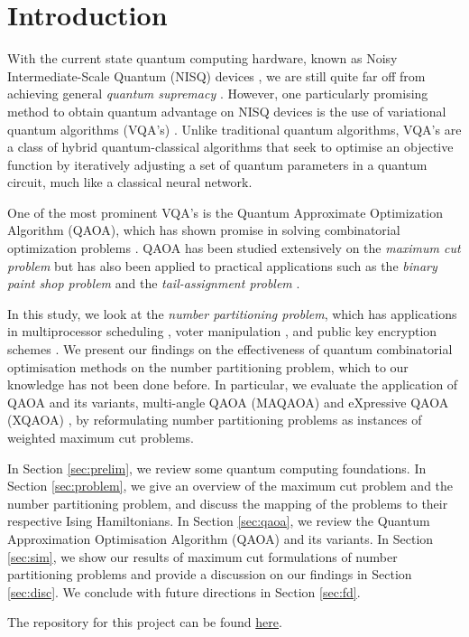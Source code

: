 \section{Introduction}

With the current state quantum computing hardware, known as Noisy Intermediate-Scale Quantum (NISQ) devices \cite{Preskill2018quantumcomputingin}, we are still quite far off from achieving general \emph{quantum supremacy} \cite{boixo2018characterizing}. However, one particularly promising method to obtain quantum advantage on NISQ devices is the use of variational quantum algorithms (VQA's) \cite{cerezo2021variational}. Unlike traditional quantum algorithms, VQA's are a class of hybrid quantum-classical algorithms that seek to optimise an objective function by iteratively adjusting a set of quantum parameters in a quantum circuit, much like a classical neural network.

One of the most prominent VQA's is the Quantum Approximate Optimization Algorithm (QAOA), which has shown promise in solving combinatorial optimization problems \cite{farhi2014quantum}. QAOA has been studied extensively on the \emph{maximum cut problem} but has also been applied to practical applications such as the \emph{binary paint shop problem} \cite{streif2021beating} and the \emph{tail-assignment problem} \cite{vikstaal2020applying}.

In this study, we look at the \emph{number partitioning problem}, which has applications in multiprocessor scheduling \cite{sarkar1987partitioning}, voter manipulation \cite{walsh2009really}, and public key encryption schemes \cite{merkle1978hiding}. We present our findings on the effectiveness of quantum combinatorial optimisation methods on the number partitioning problem, which to our knowledge has not been done before. In particular, we evaluate the application of QAOA and its variants, multi-angle QAOA (MAQAOA) \cite{herrman2022multi} and eXpressive QAOA (XQAOA) \cite{vijendran2023expressive}, by reformulating number partitioning problems as instances of weighted maximum cut problems. 

In Section \ref{sec:prelim}, we review some quantum computing foundations. In Section \ref{sec:problem}, we give an overview of the maximum cut problem and the number partitioning problem, and discuss the mapping of the problems to their respective Ising Hamiltonians. In Section \ref{sec:qaoa}, we review the Quantum Approximation Optimisation Algorithm (QAOA) and its variants. In Section \ref{sec:sim}, we show our results of maximum cut formulations of number partitioning problems and provide a discussion on our findings in Section \ref{sec:disc}. We conclude with future directions in Section \ref{sec:fd}.

The repository for this project can be found \href{https://github.com/yangdabei/quantum-number-partitioning}{here}.
